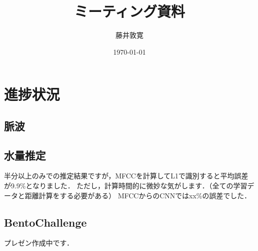 \documentclass[a4j,10pt]{jarticle}
\title{ミーティング資料}
\author{藤井敦寛}
\date{\today}
\begin{document}
\maketitle

\section{進捗状況}

\subsection{脈波}

\subsection{水量推定}
半分以上のみでの推定結果ですが，MFCCを計算してL1で識別すると平均誤差が9.9\%となりました．
ただし，計算時間的に微妙な気がします．（全ての学習データと距離計算をする必要がある）
MFCCからのCNNではxx\%の誤差でした．

\subsection{BentoChallenge}
プレゼン作成中です．





\end{document}
